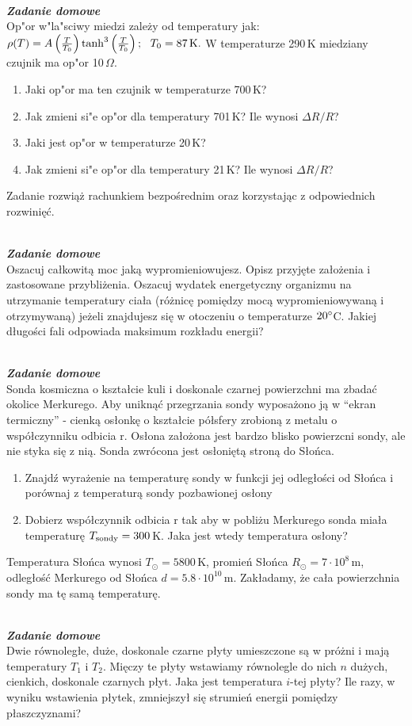 \documentclass[11pt,a4paper]{article}
\newcounter{zaddom}\newcommand{\zaddom}[1][]{\addtocounter{zaddom}{1} ~\\  {\bf \emph{Zadanie domowe \arabic{zaddom} #1 }} \\}
\begin{document}
\zaddom
Op"or w"la"sciwy miedzi zależy od temperatury jak:
$ \rho(T) = 
  A \left(\frac{T}{T_0}\right) \tanh^3 \left(\frac{T}{T_0}\right);
  ~~ T_0 = 87\,\rm{K}. 
$
W temperaturze 290\,K miedziany czujnik ma op"or 10\,$\Omega$. 
\begin{enumerate}
\item Jaki op"or ma ten czujnik w temperaturze 700\,K? 
\item Jak zmieni si"e op"or dla temperatury 701\,K? Ile wynosi $\Delta R/R$? 
\item Jaki jest op"or w temperaturze 20\,K?
\item Jak zmieni si"e op"or dla temperatury 21\,K? Ile wynosi  $\Delta R/R$?
\end{enumerate}
Zadanie rozwiąż rachunkiem bezpośrednim oraz korzystając z odpowiednich rozwinięć.

\zaddom
Oszacuj całkowitą moc jaką wypromieniowujesz. Opisz przyjęte założenia i zastosowane przybliżenia. Oszacuj
wydatek energetyczny organizmu na utrzymanie temperatury ciała (różnicę pomiędzy mocą wypromieniowywaną
i otrzymywaną) jeżeli znajdujesz się w otoczeniu o temperaturze $20\degree$C.
Jakiej długości fali odpowiada maksimum rozkładu energii?

\zaddom
Sonda kosmiczna o kształcie kuli i doskonale czarnej powierzchni ma zbadać okolice Merkurego. Aby uniknąć
przegrzania sondy wyposażono ją w “ekran termiczny” - cienką osłonkę o kształcie półsfery zrobioną z metalu
o współczynniku odbicia r. Osłona założona jest bardzo blisko powierzcni sondy, ale nie styka się z nią. Sonda
zwrócona jest osłoniętą stroną do Słońca.
\begin{enumerate}
\item Znajdź wyrażenie na temperaturę sondy w funkcji jej odległości od Słońca i porównaj z temperaturą sondy
pozbawionej osłony
\item Dobierz współczynnik odbicia r tak aby w pobliżu Merkurego sonda miała temperaturę $T_{\rm sondy}= 300$\,K. 
Jaka jest wtedy temperatura osłony?
\end{enumerate}
Temperatura Słońca wynosi $T_\odot= 5800$\,K, promień Słońca $R_\odot = 7 \cdot 10^8$\,m, 
odległość Merkurego od Słońca $d = 5.8 \cdot 10^{10}$\,m. 
Zakładamy, że cała powierzchnia sondy ma tę samą temperaturę.

\zaddom
Dwie równoległe, duże, doskonale czarne płyty umieszczone są w próżni i mają temperatury $T_1$ i $T_2$.
Mięczy te płyty wstawiamy równolegle do nich $n$ dużych, cienkich, doskonale czarnych płyt.
Jaka jest temperatura $i$-tej płyty? 
Ile razy, w wyniku wstawienia płytek, zmniejszył się strumień energii pomiędzy płaszczyznami? 
\end{document}
